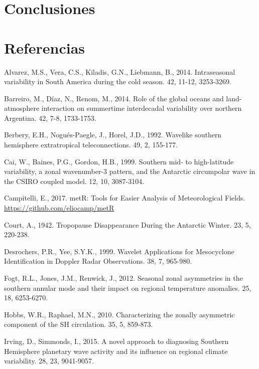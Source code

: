 \documentclass[spanish,a4paper,12pt]{book}
\begin{document}
\chapter{Conclusiones}\label{conclusiones}

\chapter*{Referencias}\label{referencias}

\hypertarget{refs}{}
\hypertarget{ref-Alvarez2014}{}
Alvarez, M.S., Vera, C.S., Kiladis, G.N., Liebmann, B., 2014.
Intraseasonal variability in South America during the cold season. 42,
11-12, 3253-3269.

\hypertarget{ref-Barreiro2014}{}
Barreiro, M., Díaz, N., Renom, M., 2014. Role of the global oceans and
land-atmosphere interaction on summertime interdecadal variability over
northern Argentina. 42, 7-8, 1733-1753.

\hypertarget{ref-Berbery1992}{}
Berbery, E.H., Nogués-Paegle, J., Horel, J.D., 1992. Wavelike southern
hemisphere extratropical teleconnections. 49, 2, 155-177.

\hypertarget{ref-Cai1999}{}
Cai, W., Baines, P.G., Gordon, H.B., 1999. Southern mid- to
high-latitude variability, a zonal wavenumber-3 pattern, and the
Antarctic circumpolar wave in the CSIRO coupled model. 12, 10,
3087-3104.

\hypertarget{ref-R-metR}{}
Campitelli, E., 2017. metR: Tools for Easier Analysis of Meteorological
Fields. \url{https://github.com/eliocamp/metR}

\hypertarget{ref-Court1942}{}
Court, A., 1942. Tropopause Disappearance During the Antarctic Winter.
23, 5, 220-238.

\hypertarget{ref-Desrochers1999}{}
Desrochers, P.R., Yee, S.Y.K., 1999. Wavelet Applications for
Mesocyclone Identification in Doppler Radar Observations. 38, 7,
965-980.

\hypertarget{ref-Fogt2012}{}
Fogt, R.L., Jones, J.M., Renwick, J., 2012. Seasonal zonal asymmetries
in the southern annular mode and their impact on regional temperature
anomalies. 25, 18, 6253-6270.

\hypertarget{ref-Hobbs2010}{}
Hobbs, W.R., Raphael, M.N., 2010. Characterizing the zonally asymmetric
component of the SH circulation. 35, 5, 859-873.

\hypertarget{ref-Irving2015}{}
Irving, D., Simmonds, I., 2015. A novel approach to diagnosing Southern
Hemisphere planetary wave activity and its influence on regional climate
variability. 28, 23, 9041-9057.
\end{document}
